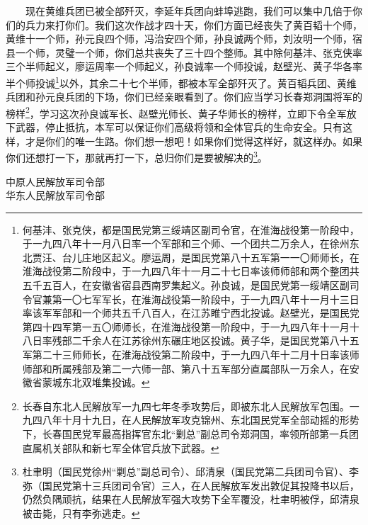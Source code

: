 \documentclass[cn,11pt,chinese]{elegantbook}
\begin{document}
　　现在黄维兵团已被全部歼灭，李延年兵团向蚌埠逃跑，我们可以集中几倍于你们的兵力来打你们。我们这次作战才四十天，你们方面已经丧失了黄百韬十个师，黄维十一个师，孙元良四个师，冯治安四个师，孙良诚两个师，刘汝明一个师，宿县一个师，灵璧一个师，你们总共丧失了三十四个整师。其中除何基沣、张克侠率三个半师起义，廖运周率一个师起义，孙良诚率一个师投诚，赵壁光、黄子华各率半个师投诚\footnote[1]{ 何基沣、张克侠，都是国民党第三绥靖区副司令官，在淮海战役第一阶段中，于一九四八年十一月八日率一个军部和三个师、一个团共二万余人，在徐州东北贾汪、台儿庄地区起义。廖运周，是国民党第八十五军第一一〇师师长，在淮海战役第二阶段中，于一九四八年十一月二十七日率该师师部和两个整团共五千五百人，在安徽省宿县西南罗集起义。孙良诚，是国民党第一绥靖区副司令官兼第一〇七军军长，在淮海战役第一阶段中，于一九四八年十一月十三日率该军军部和一个师共五千八百人，在江苏睢宁西北投诚。赵壁光，是国民党第四十四军第一五〇师师长，在淮海战役第一阶段中，于一九四八年十一月十八日率残部二千余人在江苏徐州东碾庄地区投诚。黄子华，是国民党第八十五军第二十三师师长，在淮海战役第二阶段中，于一九四八年十二月十日率该师师部和所属残部及第二一六师一部、第八十五军部分直属部队一万余人，在安徽省蒙城东北双堆集投诚。}以外，其余二十七个半师，都被本军全部歼灭了。黄百韬兵团、黄维兵团和孙元良兵团的下场，你们已经亲眼看到了。你们应当学习长春郑洞国将军的榜样\footnote[2]{ 长春自东北人民解放军一九四七年冬季攻势后，即被东北人民解放军包围。一九四八年十月十九日，在人民解放军攻克锦州、东北国民党军全部动摇的形势下，长春国民党军最高指挥官东北“剿总”副总司令郑洞国，率领所部第一兵团直属机关部队和新七军全体官兵放下武器。}，学习这次孙良诚军长、赵壁光师长、黄子华师长的榜样，立即下令全军放下武器，停止抵抗，本军可以保证你们高级将领和全体官兵的生命安全。只有这样，才是你们的唯一生路。你们想一想吧！如果你们觉得这样好，就这样办。如果你们还想打一下，那就再打一下，总归你们是要被解决的\footnote[3]{ 杜聿明（国民党徐州“剿总”副总司令）、邱清泉（国民党第二兵团司令官）、李弥（国民党第十三兵团司令官）三人，在人民解放军发出敦促其投降书以后，仍然负隅顽抗，结果在人民解放军强大攻势下全军覆没，杜聿明被俘，邱清泉被击毙，只有李弥逃走。}。\\
\begin{flushright}
中原人民解放军司令部\\
华东人民解放军司令部
\end{flushright}
\end{document}
